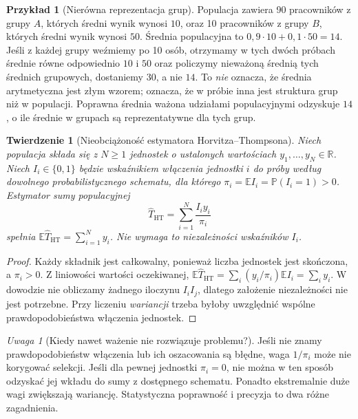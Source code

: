 \documentclass[11pt,a4paper,oneside]{report}
\numberwithin{equation}{chapter}
\theoremstyle{plain}
\newtheorem{twierdzenie}{Twierdzenie}[chapter]
\theoremstyle{definition}
\newtheorem{przyklad}{Przykład}[chapter]
\theoremstyle{remark}
\newtheorem{uwaga}{Uwaga}[chapter]
\newcommand{\R}{\mathbb R}
\newcommand{\Prob}{\mathbb P}
\newcommand{\E}{\mathbb E}
\begin{document}
\begin{przyklad}[Nierówna reprezentacja grup]\label{ex:selection}
Populacja zawiera 90 pracowników z grupy $A$, których średni wynik wynosi $10$, oraz 10 pracowników z grupy $B$, których średni wynik wynosi $50$. Średnia populacyjna to $0{,}9\cdot10+0{,}1\cdot50=14$. Jeśli z każdej grupy weźmiemy po 10 osób, otrzymamy w tych dwóch próbach średnie równe odpowiednio $10$ i $50$ oraz policzymy nieważoną średnią tych średnich grupowych, dostaniemy $30$, a nie $14$. To \emph{nie} oznacza, że średnia arytmetyczna jest złym wzorem; oznacza, że w próbie inna jest struktura grup niż w populacji. Poprawna średnia ważona udziałami populacyjnymi odzyskuje $14$, o ile średnie w grupach są reprezentatywne dla tych grup.
\end{przyklad}

\begin{twierdzenie}[Nieobciążoność estymatora Horvitza--Thompsona]\label{thm:HT}
Niech populacja składa się z $N\ge1$ jednostek o ustalonych wartościach $y_1,\ldots,y_N\in\R$. Niech $I_i\in\{0,1\}$ będzie wskaźnikiem włączenia jednostki $i$ do próby według dowolnego probabilistycznego schematu, dla którego $\pi_i=\E I_i=\Prob(I_i=1)>0$. Estymator sumy populacyjnej
\[
\widehat T_{\mathrm{HT}}=\sum_{i=1}^N\frac{I_i y_i}{\pi_i}
\]
spełnia $\E\widehat T_{\mathrm{HT}}=\sum_{i=1}^Ny_i$. Nie wymaga to niezależności wskaźników $I_i$.
\end{twierdzenie}
\begin{proof}
Każdy składnik jest całkowalny, ponieważ liczba jednostek jest skończona, a $\pi_i>0$. Z liniowości wartości oczekiwanej,
$\E\widehat T_{\mathrm{HT}}=\sum_i(y_i/\pi_i)\E I_i=\sum_i y_i$. W dowodzie nie obliczamy żadnego iloczynu $I_iI_j$, dlatego założenie niezależności nie jest potrzebne. Przy liczeniu \emph{wariancji} trzeba byłoby uwzględnić wspólne prawdopodobieństwa włączenia jednostek.
\end{proof}

\begin{uwaga}[Kiedy nawet ważenie nie rozwiązuje problemu?]
Jeśli nie znamy prawdopodobieństw włączenia lub ich oszacowania są błędne, waga $1/\pi_i$ może nie korygować selekcji. Jeśli dla pewnej jednostki $\pi_i=0$, nie można w ten sposób odzyskać jej wkładu do sumy z dostępnego schematu. Ponadto ekstremalnie duże wagi zwiększają wariancję. Statystyczna poprawność i precyzja to dwa różne zagadnienia.
\end{uwaga}
\end{document}
